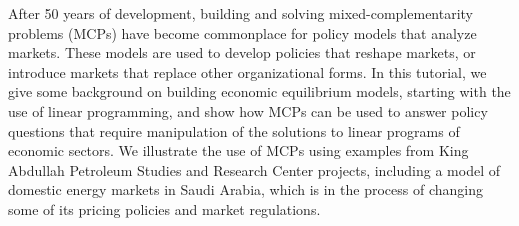 After 50 years of development, building and solving mixed-complementarity problems (MCPs) have become commonplace for policy models that analyze markets. These models are used to develop policies that reshape markets, or introduce markets that replace other organizational forms. In this tutorial, we give some background on building economic equilibrium models, starting with the use of linear programming, and show how MCPs can be used to answer policy questions that require manipulation of the solutions to linear programs of economic sectors. We illustrate the use of MCPs using examples from King Abdullah Petroleum Studies and Research Center projects, including a model of domestic energy markets in Saudi Arabia, which is in the process of changing some of its pricing policies and market regulations.